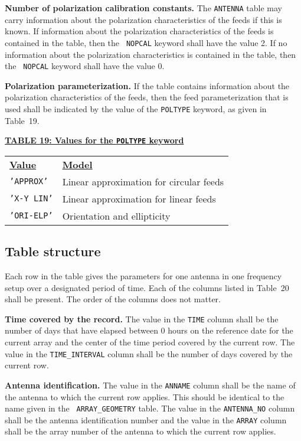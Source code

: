 \documentclass[twoside]{article}
\newcommand{\Hi}[1]{\textcolor{hicol}{#1}}
\begin{document}
{\bf Number of polarization calibration constants.}  The {\tt ANTENNA}
table may carry information about the polarization characteristics of
the feeds if this is known.  If information about the polarization
characteristics of the feeds is contained in the table, then the {\tt
  NOPCAL} keyword shall have the value 2.  If no information about the
polarization characteristics is contained in the table, then the {\tt
  NOPCAL} keyword shall have the value 0.

{\bf Polarization parameterization.} If the table contains information
about the polarization characteristics of the feeds, then the feed
parameterization that is used shall be indicated by the value of the
{\tt POLTYPE} keyword, as given in Table~\Hi{19}.

\begin{center}
\underline{\bf{TABLE \Hi{19}: Values for the {\tt POLTYPE} keyword}}\\
\begin{tabular}{ll}
\noalign{\vspace{2pt}}
\underline{{\bf Value\vphantom{y}}} & \underline{\bf{Model\vphantom{y}}} \\
\noalign{\vspace{2pt}}
{\tt 'APPROX'}  & Linear approximation for circular feeds \\
{\tt 'X-Y LIN'} & Linear approximation for linear feeds \\
{\tt 'ORI-ELP'} & Orientation and ellipticity
\end{tabular}
\end{center}

\subsection{Table structure}

Each row in the table gives the parameters for one antenna in one
frequency setup over a designated period of time.  Each of the columns
listed in Table~\Hi{20} shall be present.  The order of the columns
does not matter.

{\bf Time covered by the record.} The value in the {\tt TIME} column
shall be the number of days that have elapsed between 0 hours on the
reference date for the current array and the center of the time period
covered by the current row.  The value in the {\tt TIME\_INTERVAL}
column shall be the number of days covered by the current row.

{\bf Antenna identification.} The value in the {\tt ANNAME} column
shall be the name of the antenna to which the current row applies.
This should be identical to the name given in the {\tt
  ARRAY\_GEOMETRY} table.  The value in the {\tt ANTENNA\_NO} column
shall be the antenna identification number and \Hi{the value} in the
{\tt ARRAY} column shall be the array number of the antenna to which
the current row applies.
\end{document}
